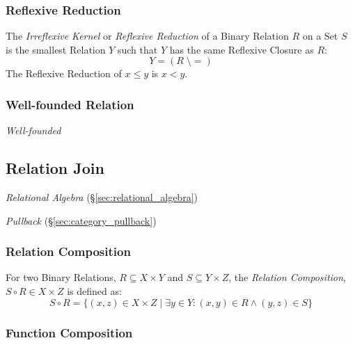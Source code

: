 \subsubsection{Reflexive Reduction}\label{sec:reflexive_reduction}

The \emph{Irreflexive Kernel} or \emph{Reflexive Reduction} of a
Binary Relation $R$ on a Set $S$ is the smallest Relation $Y$
such that $Y$ has the same Reflexive Closure as $R$:
\[
    Y = (R\;\setminus=)
\]
The Reflexive Reduction of $x \leq y$ is $x < y$.



\subsubsection{Well-founded Relation}\label{sec:well_founded}

\emph{Well-founded}



\subsection{Relation Join}\label{sec:relation_join}

\emph{Relational Algebra} (\S\ref{sec:relational_algebra})

\emph{Pullback} (\S\ref{sec:category_pullback})



\subsubsection{Relation Composition}\label{sec:relation_composition}

For two Binary Relations, $R \subseteq X \times Y$ and $S \subseteq Y
\times Z$, the \emph{Relation Composition}, $S \circ R \in X \times Z$
is defined as:
\[
    S \circ R = \{(x,z) \in X \times Z \;|\;
    \exists y \in Y : (x,y) \in R \wedge (y,z) \in S \}
\]



\subsubsection{Function Composition}\label{sec:function_composition}



